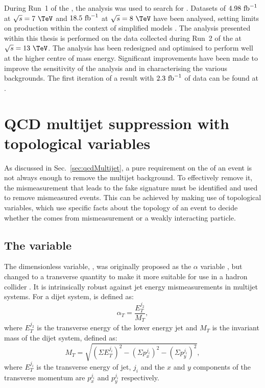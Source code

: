 During Run~1 of the \LHC, the \alphat analysis was used
to search for \SUSY. Datasets of $4.98~\text{fb}^{-1}$ at
$\sqrt{s}=7~\tev$ and $18.5~\text{fb}^{-1}$ at $\sqrt{s}=8~\tev$ have been
analysed, setting limits on \SUSY production within the context of
simplified models
\cite{Chatrchyan:2011zy,Khachatryan:2011tk,Chatrchyan:2012wa,Chatrchyan:2013mys,Khachatryan:2016pxa}.
The analysis presented within this thesis is performed on the data
collected during Run~2 of the \LHC at $\sqrt{s}=13~\tev$. The analysis
has been redesigned and optimised to perform well at the higher centre
of mass energy. Significant improvements have been made to improve the
sensitivity of the analysis and in characterising the various
backgrounds. The first iteration of a result with $2.3~\text{fb}^{-1}$ of data
can be found at \cite{CMS:2015dbr}.

\section{QCD multijet suppression with topological variables} %
\label{sec:topoVars}

As discussed in Sec.~\ref{sec:qcdMultijet}, a pure requirement on the
\MET of an event is not always enough to remove the \QCD multijet
background.  To effectively remove it, the mismeasurement that leads
to the fake \MET signature must be identified and used to remove
mismeasured events. This can be achieved by making use of topological
variables, which use specific facts about the topology of an event to
decide whether the \MET comes from mismeasurement or a weakly
interacting particle. 

\subsection{The \alphat variable}

The dimensionless variable, \alphat, was originally proposed as the
$\alpha$ variable \cite{Randall:2008rw}, but changed to a transverse
quantity to make it more suitable for use in a hadron collider
\cite{CMS-PAS-SUS-08-005,CMS-PAS-SUS-09-001}. It is intrinsically
robust against jet energy mismeasurements in multijet systems. For a
dijet system, \alphat is defined as: 
\begin{equation}
\alpha_T=\frac{E_T^{j_2}}{M_T}, 
\end{equation} 
where $E_T^{j_2}$ is the transverse energy of the lower energy jet and
$M_T$ is the invariant mass of the dijet
system, defined as:
\begin{equation}
M_T=\sqrt{(\Sigma E_T^{j_i})^2-(\Sigma p_x^{j_i})^2-(\Sigma
p_y^{j_i})^2},
\end{equation}
where $E_T^{j_i}$ is the transverse energy of jet, $j_i$ and the $x$
and $y$ components of the transverse momentum are $p_x^{j_i}$ and
$p_y^{j_i}$ respectively.

